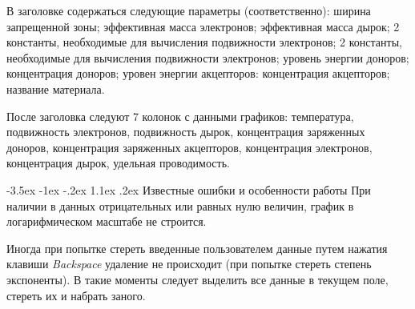 \documentclass[12pt,a4paper]{extarticle}
\makeatletter
\renewcommand\section{\@startsection{section}{1}{\z@}%
	{-3.5ex \@plus -1ex \@minus -.2ex}%
	{1.1ex \@plus.2ex}%
	{\normalfont\normalfont\bfseries}}%
\makeatother
\begin{document}
В заголовке содержаться следующие параметры (соответственно): ширина запрещенной зоны; эффективная масса электронов; эффективная масса дырок; 2 константы, необходимые для вычисления подвижности электронов; 2 константы, необходимые для вычисления подвижности электронов; уровень энергии доноров; концентрация доноров; уровен энергии акцепторов: концентрация акцепторов; название материала.

После заголовка следуют 7 колонок с данными графиков: температура, подвижность электронов, подвижность дырок, концентрация заряженных доноров, концентрация заряженных акцепторов, концентрация электронов, концентрация дырок, удельная проводимость.

\section{Известные ошибки и особенности работы}
При наличии в данных отрицательных или равных нулю величин, график в логарифмическом масштабе не строится.

Иногда при попытке стереть введенные пользователем данные путем нажатия клавиши \textit{Backspace} удаление не происходит (при попытке стереть степень экспоненты). В такие моменты следует выделить все данные в текущем поле, стереть их и набрать заного.
\end{document}
